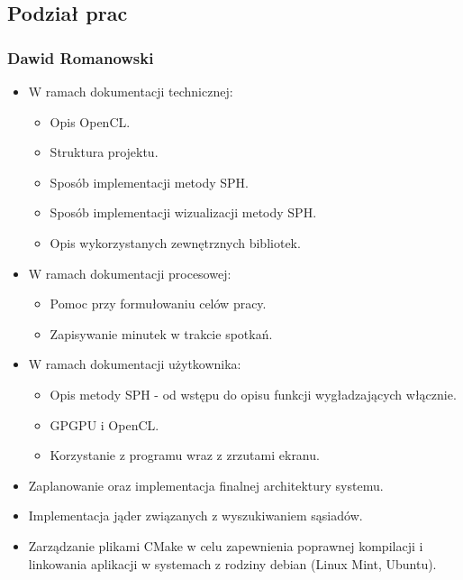 \documentclass[polish, 12pt]{aghthesis}
\begin{document}
	\subsection{Podział prac}
	
		\subsubsection*{Dawid Romanowski} 
		
		\begin{itemize}
		
			\item W ramach dokumentacji technicznej:
			
				\begin{itemize}
				
					\item Opis OpenCL.
					\item Struktura projektu.
					\item Sposób implementacji metody SPH.
					\item Sposób implementacji wizualizacji metody SPH.
					\item Opis wykorzystanych zewnętrznych bibliotek.
				
				\end{itemize}
			
			\item W ramach dokumentacji procesowej:
			
				\begin{itemize}
				
					\item Pomoc przy formułowaniu celów pracy.
					\item Zapisywanie minutek w trakcie spotkań.
				
				\end{itemize}
			
			\item W ramach dokumentacji użytkownika:
			
				\begin{itemize}
				
					\item Opis metody SPH - od wstępu do opisu funkcji wygładzających włącznie.
					
					\item GPGPU i OpenCL.
					
					\item Korzystanie z programu wraz z zrzutami ekranu.
				
				\end{itemize}
			
			\item Zaplanowanie oraz implementacja finalnej architektury systemu.
			
			\item Implementacja jąder związanych z wyszukiwaniem sąsiadów.
			
			\item Zarządzanie plikami CMake w celu zapewnienia poprawnej kompilacji i linkowania aplikacji w systemach z rodziny debian (Linux Mint, Ubuntu).
		
		\end{itemize}
		
\end{document}

